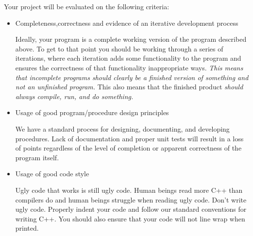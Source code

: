 \documentclass[]{tufte-handout}
\begin{document}
Your project will be evaluated on the following criteria:
\begin{itemize}
\item Completeness,correctness and evidence of an iterative development process

Ideally, your program is a complete working version of the program described above. To get to that point you should be working through a series of iterations, where each iteration adds some functionality to the program and ensures the correctness of that functionality inappropriate ways.  \textit{This means that incomplete programs should clearly be a finished version of something and not an unfinished program.} This also means that the finished product \textit{should always compile, run, and do something.} 

\item Usage of good program/procedure design principles

We have a standard process for designing, documenting, and developing procedures. Lack of documentation and proper unit tests will result in a loss of points regardless of the level of completion or apparent correctness of the program itself.

\item Usage of good code style

Ugly code that works is still ugly code. Human beings read more C++ than compilers do and human beings struggle when reading ugly code. Don't write ugly code.  Properly indent your code and follow our standard conventions for writing C++.  You should also ensure that your code will not line wrap when printed.
\end{itemize}
\end{document}
